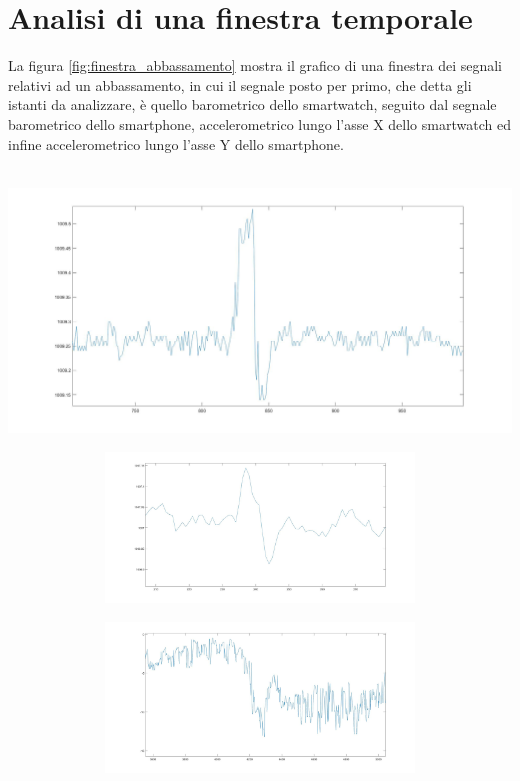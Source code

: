 \documentclass[a4paper, oneside]{book}
\begin{document}
\section{Analisi di una finestra temporale}
La figura \ref{fig:finestra_abbassamento} mostra il grafico di una finestra dei segnali relativi ad un abbassamento, in cui il segnale posto per primo, che detta gli istanti da analizzare, è quello barometrico dello smartwatch, seguito dal segnale barometrico dello smartphone, accelerometrico lungo l'asse X dello smartwatch ed infine accelerometrico lungo l'asse Y dello smartphone.\\ \\
\begin{minipage}{\linewidth}
\begin{center}
\vspace{1mm}
\includegraphics[width=154mm, height= 65mm]{./images/finestra_abbassamento/pressure_watch.jpg} 
\end{center}
\end{minipage}
\begin{minipage}{\linewidth}
\begin{center}
\includegraphics[width=154mm, height= 40mm]{./images/finestra_abbassamento/pressure_phone.jpg} 
\end{center}
\end{minipage}
\begin{minipage}{\linewidth}
\begin{center}
\includegraphics[width=154mm, height= 40mm]{./images/finestra_abbassamento/accelerometr_watchX.jpg} 
\end{center}
\end{minipage}
\end{document}
